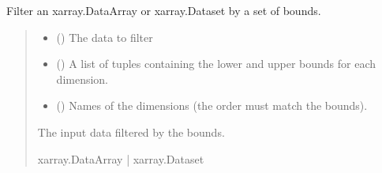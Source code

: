 \documentclass[letterpaper,10pt,english]{sphinxmanual}
\begin{document}
\begin{fulllineitems}
\label{\detokenize{misc:glomar_gridding.utils.select_bounds}}
\pysigstartsignatures
\pysiglinewithargsret
{}
{\sphinxparamcomma {}\sphinxparamcomma {}}
{}
\pysigstopsignatures
\sphinxAtStartPar
Filter an xarray.DataArray or xarray.Dataset by a set of bounds.
\begin{quote}\begin{description}
\begin{itemize}
\item {}
\sphinxAtStartPar
{} (\sphinxstyleliteralemphasis{\sphinxupquote{ | }}) \textendash{} The data to filter

\item {}
\sphinxAtStartPar
{} (\sphinxstyleliteralemphasis{\sphinxupquote{{[}}}\sphinxstyleliteralemphasis{\sphinxupquote{{[}}}\sphinxstyleliteralemphasis{\sphinxupquote{, }}\sphinxstyleliteralemphasis{\sphinxupquote{{]}}}\sphinxstyleliteralemphasis{\sphinxupquote{{]}}}) \textendash{} A list of tuples containing the lower and upper bounds for each
dimension.

\item {}
\sphinxAtStartPar
{} (\sphinxstyleliteralemphasis{\sphinxupquote{{[}}}\sphinxstyleliteralemphasis{\sphinxupquote{{]}}}) \textendash{} Names of the dimensions (the order must match the bounds).

\end{itemize}

\sphinxAtStartPar
{} \textendash{} The input data filtered by the bounds.

\sphinxAtStartPar
xarray.DataArray | xarray.Dataset

\end{description}\end{quote}

\end{fulllineitems}
\end{document}
